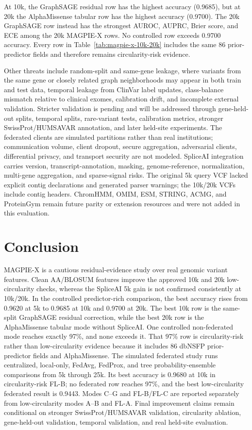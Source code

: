 \documentclass[conference]{IEEEtran}
\begin{document}
At 10k, the GraphSAGE residual row has the highest accuracy (0.9685), but at 20k the AlphaMissense tabular row has the highest accuracy (0.9700). The 20k GraphSAGE row instead has the strongest AUROC, AUPRC, Brier score, and ECE among the 20k MAGPIE-X rows. No controlled row exceeds 0.9700 accuracy. Every row in Table~\ref{tab:magpie-x-10k-20k} includes the same 86 prior-predictor fields and therefore remains circularity-risk evidence.

Other threats include random-split and same-gene leakage, where variants from the same gene or closely related graph neighborhoods may appear in both train and test data, temporal leakage from ClinVar label updates, class-balance mismatch relative to clinical exomes, calibration drift, and incomplete external validation. Stricter validation is pending and will be addressed through gene-held-out splits, temporal splits, rare-variant tests, calibration metrics, stronger SwissProt/HUMSAVAR annotation, and later held-site experiments. The federated clients are simulated partitions rather than real institutions; communication volume, client dropout, secure aggregation, adversarial clients, differential privacy, and transport security are not modeled. SpliceAI integration carries version, transcript-annotation, masking, genome-reference, normalization, multi-gene aggregation, and sparse-signal risks. The original 5k query VCF lacked explicit contig declarations and generated parser warnings; the 10k/20k VCFs include contig headers. ChromHMM, OMIM, ESM, STRING, ACMG, and ProteinGym remain future parity or extension resources and were not added in this evaluation.

\section{Conclusion}
MAGPIE-X is a cautious residual-evidence study over real genomic variant features. Clean AA/BLOSUM features improve the approved 10k and 20k low-circularity checks, whereas the SpliceAI 5k gain is not confirmed consistently at 10k/20k. In the controlled predictor-rich comparison, the best accuracy rises from 0.9620 at 5k to 0.9685 at 10k and 0.9700 at 20k. The best 10k row is the same-split GraphSAGE residual correction, while the best 20k row is the AlphaMissense tabular mode without SpliceAI. One controlled non-federated mode reaches exactly 97\%, and none exceeds it. That 97\% row is circularity-risk rather than low-circularity evidence because it includes 86 dbNSFP prior-predictor fields and AlphaMissense. The simulated federated study runs centralized, local-only, FedAvg, FedProx, and tree probability-ensemble comparisons from 5k through 25k. Its best accuracy is 0.9680 at 10k in circularity-risk FL-B; no federated row reaches 97\%, and the best low-circularity federated result is 0.9443. Modes C--G and FL-B/FL-C are reported separately from low-circularity modes A--B and FL-A. Final improvement claims remain conditional on stronger SwissProt/HUMSAVAR validation, circularity ablation, gene-held-out validation, temporal validation, and real held-site evaluation.



\end{document}
